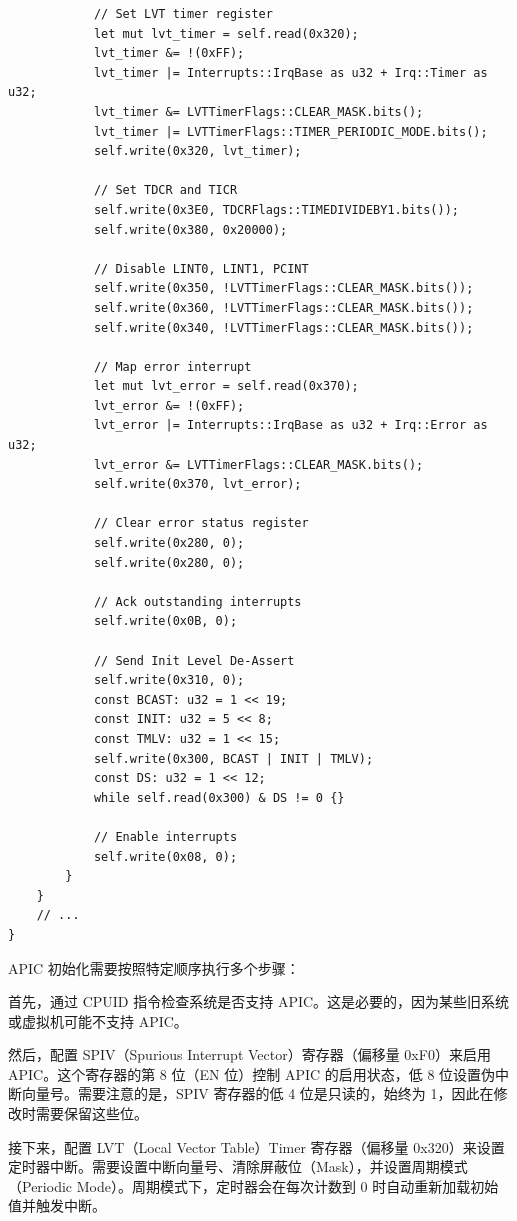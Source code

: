 \documentclass{SYSUReport}
\begin{document}
\begin{enumerate}[label={\chinese*、},labelsep=0pt, start=4]
\begin{verbatim}
            // Set LVT timer register
            let mut lvt_timer = self.read(0x320);
            lvt_timer &= !(0xFF);
            lvt_timer |= Interrupts::IrqBase as u32 + Irq::Timer as u32;
            lvt_timer &= LVTTimerFlags::CLEAR_MASK.bits();
            lvt_timer |= LVTTimerFlags::TIMER_PERIODIC_MODE.bits();
            self.write(0x320, lvt_timer);

            // Set TDCR and TICR
            self.write(0x3E0, TDCRFlags::TIMEDIVIDEBY1.bits());
            self.write(0x380, 0x20000);

            // Disable LINT0, LINT1, PCINT
            self.write(0x350, !LVTTimerFlags::CLEAR_MASK.bits());
            self.write(0x360, !LVTTimerFlags::CLEAR_MASK.bits());
            self.write(0x340, !LVTTimerFlags::CLEAR_MASK.bits());
            
            // Map error interrupt
            let mut lvt_error = self.read(0x370);
            lvt_error &= !(0xFF);
            lvt_error |= Interrupts::IrqBase as u32 + Irq::Error as u32;
            lvt_error &= LVTTimerFlags::CLEAR_MASK.bits();
            self.write(0x370, lvt_error);

            // Clear error status register
            self.write(0x280, 0);
            self.write(0x280, 0);

            // Ack outstanding interrupts
            self.write(0x0B, 0);

            // Send Init Level De-Assert
            self.write(0x310, 0);
            const BCAST: u32 = 1 << 19;
            const INIT: u32 = 5 << 8;
            const TMLV: u32 = 1 << 15;
            self.write(0x300, BCAST | INIT | TMLV);
            const DS: u32 = 1 << 12;
            while self.read(0x300) & DS != 0 {}

            // Enable interrupts
            self.write(0x08, 0);
        }
    }
    // ...
}
    \end{verbatim}

    APIC 初始化需要按照特定顺序执行多个步骤：

    首先，通过 CPUID 指令检查系统是否支持 APIC。这是必要的，因为某些旧系统或虚拟机可能不支持 APIC。

    然后，配置 SPIV（Spurious Interrupt Vector）寄存器（偏移量 0xF0）来启用 APIC。这个寄存器的第 8 位（EN 位）控制 APIC 的启用状态，低 8 位设置伪中断向量号。需要注意的是，SPIV 寄存器的低 4 位是只读的，始终为 1，因此在修改时需要保留这些位。

    接下来，配置 LVT（Local Vector Table）Timer 寄存器（偏移量 0x320）来设置定时器中断。需要设置中断向量号、清除屏蔽位（Mask），并设置周期模式（Periodic Mode）。周期模式下，定时器会在每次计数到 0 时自动重新加载初始值并触发中断。


\end{enumerate}
\end{document}
